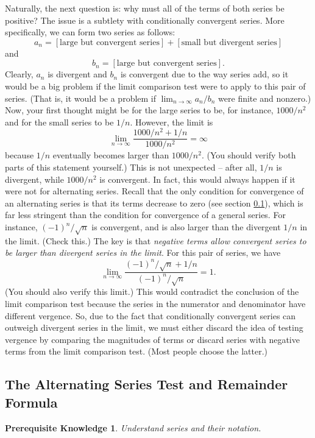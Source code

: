 \documentclass{myarticle}
\theoremstyle{nospace}
\newtheorem*{oldprereq}{Prerequisite Knowledge}
\newenvironment{prereq}{\begin{mdframed}\begin{oldprereq}}{\end{oldprereq}\end{mdframed}}
\newtheorem{old series theorem}{Theorem}
\newenvironment{series theorem}{\begin{mdframed}\begin{old series theorem}}{\end{old series theorem}\end{mdframed}}
\begin{document}
Naturally, the next question is: why must all of the terms of both series be positive? The issue is a subtlety with conditionally convergent series. More specifically, we can form two series as follows: \[ a_n = [\text{large but convergent series}] + [\text{small but divergent series}] \] and \[ b_n = [\text{large but convergent series}]. \] Clearly, $a_n$ is divergent and $b_n$ is convergent due to the way series add, so it would be a big problem if the limit comparison test were to apply to this pair of series. (That is, it would be a problem if $\lim_{n \to \infty} a_n/b_n$ were finite and nonzero.) Now, your first thought might be for the large series to be, for instance, $1000/n^2$ and for the small series to be $1/n$. However, the limit is \[ \lim_{n \to \infty} \frac{1000/n^2 + 1/n}{1000/n^2} = \infty \] because $1/n$ eventually becomes larger than $1000/n^2$. (You should verify both parts of this statement yourself.) This is not unexpected -- after all, $1/n$ is divergent, while $1000/n^2$ is convergent. In fact, this would always happen if it were not for alternating series. Recall that the only condition for convergence of an alternating series is that its terms decrease to zero (see section \ref{sec:alternating series test}), which is far less stringent than the condition for convergence of a general series. For instance, $(-1)^n/\sqrt{n}$ is convergent, and is also larger than the divergent $1/n$ in the limit. (Check this.) The key is that \emph{negative terms allow convergent series to be larger than divergent series in the limit}. For this pair of series, we have \[ \lim_{n \to \infty} \frac{(-1)^n/\sqrt{n} + 1/n}{(-1)^n/\sqrt{n}} = 1. \] (You should also verify this limit.) This would contradict the conclusion of the limit comparison test because the series in the numerator and denominator have different vergence. So, due to the fact that conditionally convergent series can outweigh divergent series in the limit, we must either discard the idea of testing vergence by comparing the magnitudes of terms or discard series with negative terms from the limit comparison test. (Most people choose the latter.)

\subsection{The Alternating Series Test and Remainder Formula} \label{sec:alternating series test}

\begin{prereq} Understand series and their notation. \end{prereq}
\end{document}
